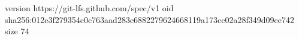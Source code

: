 version https://git-lfs.github.com/spec/v1
oid sha256:012e3f279354c0c763aad283e6882279624668119a173cc02a28f349d09ee742
size 74
